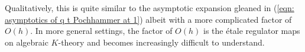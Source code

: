 Qualitatively, this is quite similar to the asymptotic expansion gleaned in (\ref{eqn: asymptotics of q t Pochhammer at 1}) albeit with a more complicated factor of $O(h)$. In more general settings, the factor of $O(h)$ is the \'{e}tale regulator maps on algebraic $K$-theory and becomes increasingly difficult to understand. 
